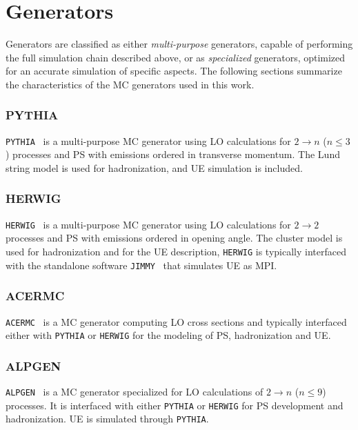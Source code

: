 \section{Generators}\label{sec:generators}

Generators are classified as either {\it multi-purpose}
generators, capable of performing the full simulation chain described
above, or as {\it specialized} generators, optimized for
an accurate simulation of specific aspects.
The following sections summarize the characteristics of the MC
generators used in this work.

\subsubsection*{PYTHIA}

\texttt{PYTHIA}~\cite{pythia6,pythia8} is a multi-purpose MC
generator using LO calculations for $2 \to n$ ($n\leq 3$) processes
and PS with emissions ordered in transverse momentum. 
The Lund string model is used for hadronization, and UE simulation is
included.

\subsubsection*{HERWIG}

\texttt{HERWIG}~\cite{herwig} is a multi-purpose MC generator using LO
calculations for $2 \to 2$ processes and PS with emissions ordered in
opening angle. 
The cluster model is used for hadronization and for the UE
description, \texttt{HERWIG} is typically interfaced with the
standalone software \texttt{JIMMY}~\cite{jimmy} that simulates UE as MPI.

\subsubsection*{ACERMC}

\texttt{ACERMC}~\cite{acermc} is a MC generator computing LO cross
sections and typically interfaced either with \texttt{PYTHIA} or 
\texttt{HERWIG} for the modeling of PS, hadronization and UE.

\subsubsection*{ALPGEN}

\texttt{ALPGEN}~\cite{alpgen} is a MC generator specialized
for LO calculations of $2 \to n$ ($n\leq 9$)
processes. It is interfaced with either
\texttt{PYTHIA} or \texttt{HERWIG} for PS development and
hadronization. UE is simulated through \texttt{PYTHIA}. 

